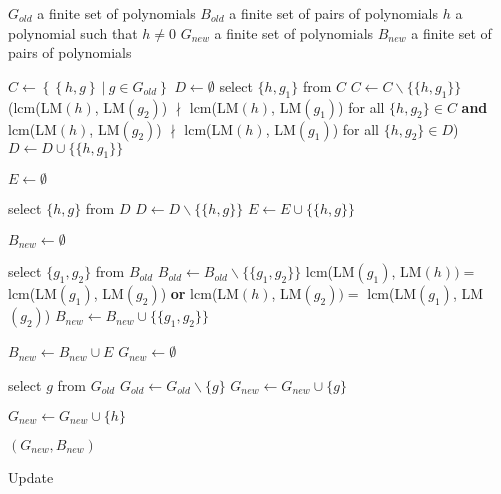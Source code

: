 \begin{algorithm}[htp]
  \begin{algorithmic}[1]
    \Require
      \Statex $G_{old}$ a finite set of polynomials
      \Statex $B_{old}$ a finite set of pairs of polynomials
      \Statex $h$ a polynomial such that $h \neq 0$
    \Ensure
      \Statex $G_{new}$ a finite set of polynomials
      \Statex $B_{new}$ a finite set of pairs of polynomials
      \Statex

    \State $C \gets \left\{\left\{h, g\right\}\ |\ g\in G_{old}\right\}$
    \State $D \gets \emptyset$
     \label{alg:update:w1b}
      \State select $\{h,g_1\}$ from $C$
      \State $C \gets C\backslash \{\{h, g_1\}\}$
        \StatexIndent[3](lcm(LM$(h)$, LM$(g_2)$) $\nmid$ lcm(LM$(h)$, LM$(g_1)$) for all $\{h, g_2\}\in C$ \textbf{and}
        \StatexIndent[3]lcm(LM$(h)$, LM$(g_2)$) $\nmid$ lcm(LM$(h)$, LM$(g_1)$) for all $\{h, g_2\} \in D$) \algorithmicthen
        \State $D \gets D \cup \{\{h, g_1\}\}$
      \EndIf
    \EndWhile \label{alg:update:w1e}

    \State $E \gets \emptyset$

     \label{alg:update:w2b}
      \State select $\{h, g\}$ from $D$
      \State $D \gets D\backslash \{\{h, g\}\}$
        \State $E \gets E \cup \{\{h, g\}\}$
      \EndIf
    \EndWhile \label{alg:update:w2e}

    \State $B_{new} \gets \emptyset$

     \label{alg:update:w3b}
      \State select $\{g_1, g_2\}$ from $B_{old}$
      \State $B_{old} \gets B_{old} \backslash \{\{g_1, g_2\}\}$
        \StatexIndent[3]lcm(LM$(g_1)$, LM$(h)) = $ lcm(LM$(g_1)$, LM$(g_2)$) \textbf{or}
        \StatexIndent[3]lcm(LM$(h)$, LM$(g_2)) = $ lcm(LM$(g_1)$, LM$(g_2)$) \algorithmicthen
        \State $B_{new} \gets B_{new} \cup \{\{g_1, g_2\}\}$
      \EndIf
    \EndWhile \label{alg:update:w3e}

    \State $B_{new} \gets B_{new} \cup E$
    \State $G_{new} \gets \emptyset$
    
      \State select $g$ from $G_{old}$
      \State $G_{old} \gets G_{old} \backslash \{g\}$
        \State $G_{new} \gets G_{new} \cup \{g\}$
      \EndIf
    \EndWhile

    \State $G_{new} \gets G_{new} \cup \{h\}$

    \State \Return $(G_{new}, B_{new})$

  \end{algorithmic}
  \caption{Update}
  \label{alg:update}
\end{algorithm}
